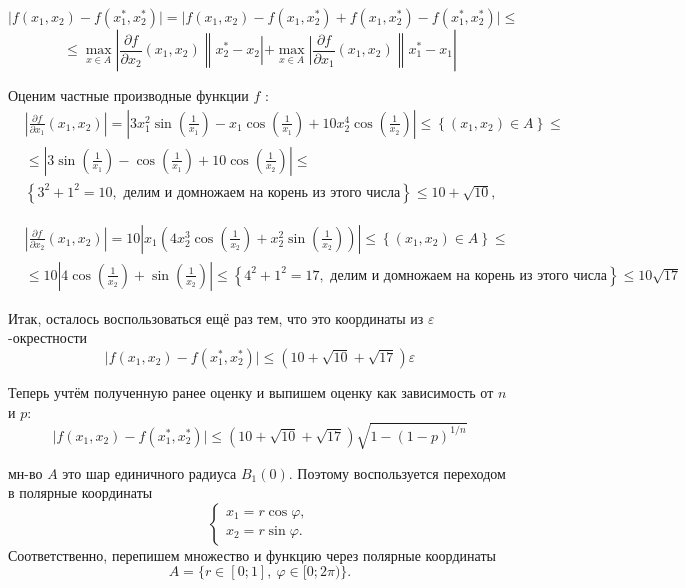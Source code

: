 \documentclass[11pt]{article}
\begin{document}
$$
 \mid f(x_1, x_2) - f(x_1^{*}, x_2^{*}) \mid =  \mid f(x_1, x_2)-f(x_1,x_2^{*})+  f(x_1, x_2^{*})-f(x_1^{*}, x_2^{*}) \mid \leqslant 
$$
$$
 \leqslant \max \limits_{x \in A}\left|\frac{\partial f}{\partial x_2}(x_1, x_2) \left\|x_2^*- x_2\left|+\max \limits_{x \in A}\right| \frac{\partial f}{\partial x_1}(x_1, x_2) \right\| x_1^*- x_1\right|
$$


Оценим частные производные функции $f$ :
$$
\begin{aligned}
&\left| \frac{\partial f}{\partial x_1}(x_1, x_2) \right|=\left|3 x_1^2 \sin \left(\frac{1}{x_1}\right)-x_1 \cos \left(\frac{1}{x_1}\right)+10 x_2^4 \cos \left(\frac{1}{x_2}\right)\right| \leqslant\left\{\left(x_1, x_2\right) \in A\right\} \leqslant \\
& \leqslant\left|3 \sin \left(\frac{1}{x_1}\right)-\cos \left(\frac{1}{x_1}\right)+10 \cos \left(\frac{1}{x_2}\right)\right| \leqslant \\
& \left\{ 3^2 + 1^2 = 10,  \text{ делим и домножаем на корень из этого числа} \right\} \leqslant 10+\sqrt{10},
\end{aligned}
$$


$$
\begin{aligned}
& \left| \frac{\partial f}{\partial x_2}(x_1, x_2) \right|=10\left|x_1\left(4 x_2^3 \cos \left(\frac{1}{x_2}\right)+x_2^2 \sin \left(\frac{1}{x_2}\right)\right)\right|  \leqslant\left\{\left(x_1, x_2\right) \in A\right\} \leqslant \\
 & \leqslant 10\left|4 \cos \left(\frac{1}{x_2}\right)+\sin \left(\frac{1}{x_2}\right)\right| \leqslant \left\{ 4^2 + 1^2 = 17,\text{ делим и домножаем на корень из этого числа} \right\} \leqslant 10 \sqrt{17}
 \end{aligned}
$$

Итак, осталось воспользоваться ещё раз тем, что это координаты из $\varepsilon$-окрестности
$$
\mid f(x_1, x_2) - f(x_1^{*}, x_2^{*}) \mid \leqslant (10+\sqrt{10} + \sqrt{17}) \varepsilon
$$

Теперь учтём полученную ранее оценку и выпишем оценку как зависимость от $n$ и $p$:
$$
    \mid f(x_1, x_2) - f(x_1^{*}, x_2^{*}) \mid \leqslant (10+\sqrt{10} + \sqrt{17}) \sqrt{1 - (1 - p)^{1/n}}
$$

мн-во $A$ это шар единичного радиуса $B_1(0)$. Поэтому воспользуется переходом в полярные координаты 
$$
    \begin{cases}
        x_1 = r \cos{\varphi}, \\
        x_2 = r \sin{\varphi}.
    \end{cases}
$$
Соответственно, перепишем множество и функцию через полярные координаты
$$
    A = \{ r \in [0;1],~ \varphi \in [0; 2\pi) \}.    
$$
\end{document}
